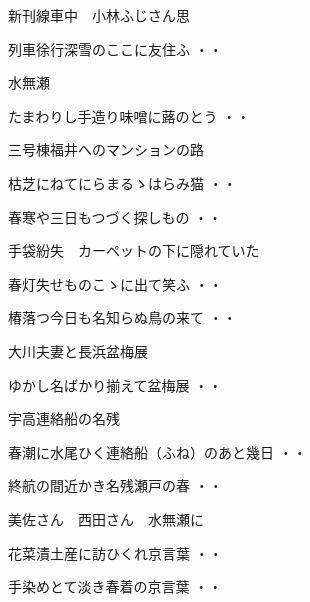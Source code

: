 新刊線車中　小林ふじさん思
\begin{shiika}列車徐行深雪のここに友住ふ
\hfill{・・}\end{shiika}
\vspace{0.6cm}
水無瀬
\begin{shiika}たまわりし手造り味噌に蕗のとう
\hfill{・・}\end{shiika}
\vspace{0.6cm}
三号棟福井へのマンションの路
\begin{shiika}枯芝にねてにらまるゝはらみ猫
\hfill{・・}\end{shiika}
\vspace{0.6cm}
\begin{shiika}春寒や三日もつづく探しもの
\hfill{・・}\end{shiika}
\vspace{0.6cm}
手袋紛失　カーペットの下に隠れていた
\begin{shiika}春灯失せものこゝに出て笑ふ
\hfill{・・}\end{shiika}
\vspace{0.6cm}
\begin{shiika}椿落つ今日も名知らぬ鳥の来て
\hfill{・・}\end{shiika}
\vspace{0.6cm}
大川夫妻と長浜盆梅展
\begin{shiika}ゆかし名ばかり揃えて盆梅展
\hfill{・・}\end{shiika}
\vspace{0.6cm}
宇高連絡船の名残
\begin{shiika}春潮に水尾ひく連絡船（ふね）のあと幾日
\hfill{・・}\end{shiika}
\begin{shiika}終航の間近かき名残瀬戸の春
\hfill{・・}\end{shiika}
\vspace{0.6cm}
美佐さん　西田さん　水無瀬に
\begin{shiika}花菜漬土産に訪ひくれ京言葉
\hfill{・・}\end{shiika}
\begin{shiika}手染めとて淡き春着の京言葉
\hfill{・・}\end{shiika}
